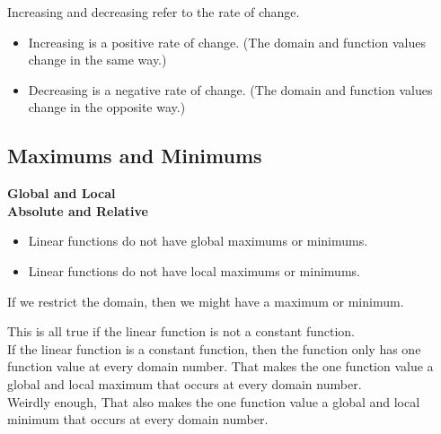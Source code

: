 \documentclass{ximera}
\begin{document}
Increasing and decreasing refer to the rate of change.


\begin{itemize}
\item Increasing is a positive rate of change. (The domain and function values change in the same way.)
\item Decreasing is a negative rate of change. (The domain and function values change in the opposite way.)
\end{itemize}
















\subsection*{Maximums and Minimums}

\textbf{\textcolor{blue!55!black}{Global and Local}} \\
\textbf{\textcolor{blue!55!black}{Absolute and Relative}} \\


\begin{itemize}
     \item Linear functions do not have global maximums or minimums. 
     \item Linear functions do not have local maximums or minimums. 
\end{itemize}


If we restrict the domain, then we might have a maximum or minimum. \\



\begin{warning}

This is all true if the linear function is not a constant function. \\


If the linear function is a constant function, then the function only has one function value at every domain number.  That makes the one function value a global and local maximum that occurs at every domain number. \\

Weirdly enough, That also makes the one function value a global and local minimum that occurs at every domain number.

\end{warning}
\end{document}
